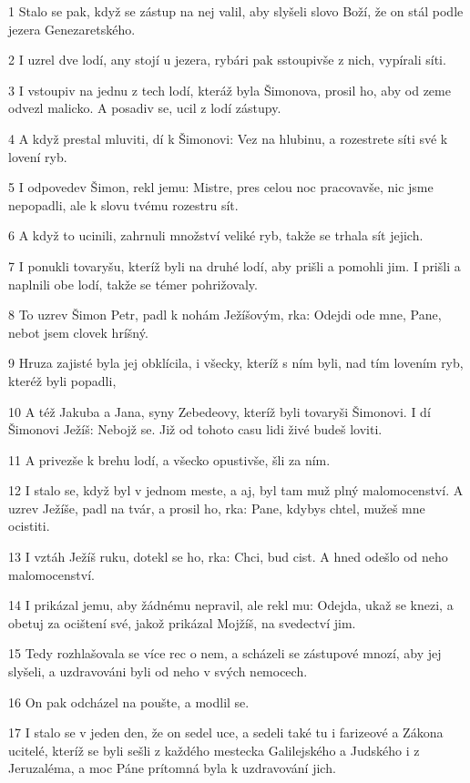 \par 1 Stalo se pak, když se zástup na nej valil, aby slyšeli slovo Boží, že on stál podle jezera Genezaretského.
\par 2 I uzrel dve lodí, any stojí u jezera, rybári pak sstoupivše z nich, vypírali síti.
\par 3 I vstoupiv na jednu z tech lodí, kteráž byla Šimonova, prosil ho, aby od zeme odvezl malicko. A posadiv se, ucil z lodí zástupy.
\par 4 A když prestal mluviti, dí k Šimonovi: Vez na hlubinu, a rozestrete síti své k lovení ryb.
\par 5 I odpovedev Šimon, rekl jemu: Mistre, pres celou noc pracovavše, nic jsme nepopadli, ale k slovu tvému rozestru sít.
\par 6 A když to ucinili, zahrnuli množství veliké ryb, takže se trhala sít jejich.
\par 7 I ponukli tovaryšu, kteríž byli na druhé lodí, aby prišli a pomohli jim. I prišli a naplnili obe lodí, takže se témer pohrižovaly.
\par 8 To uzrev Šimon Petr, padl k nohám Ježíšovým, rka: Odejdi ode mne, Pane, nebot jsem clovek hríšný.
\par 9 Hruza zajisté byla jej obklícila, i všecky, kteríž s ním byli, nad tím lovením ryb, kteréž byli popadli,
\par 10 A též Jakuba a Jana, syny Zebedeovy, kteríž byli tovaryši Šimonovi. I dí Šimonovi Ježíš: Nebojž se. Již od tohoto casu lidi živé budeš loviti.
\par 11 A privezše k brehu lodí, a všecko opustivše, šli za ním.
\par 12 I stalo se, když byl v jednom meste, a aj, byl tam muž plný malomocenství. A uzrev Ježíše, padl na tvár, a prosil ho, rka: Pane, kdybys chtel, mužeš mne ocistiti.
\par 13 I vztáh Ježíš ruku, dotekl se ho, rka: Chci, bud cist. A hned odešlo od neho malomocenství.
\par 14 I prikázal jemu, aby žádnému nepravil, ale rekl mu: Odejda, ukaž se knezi, a obetuj za ocištení své, jakož prikázal Mojžíš, na svedectví jim.
\par 15 Tedy rozhlašovala se více rec o nem, a scházeli se zástupové mnozí, aby jej slyšeli, a uzdravováni byli od neho v svých nemocech.
\par 16 On pak odcházel na poušte, a modlil se.
\par 17 I stalo se v jeden den, že on sedel uce, a sedeli také tu i farizeové a Zákona ucitelé, kteríž se byli sešli z každého mestecka Galilejského a Judského i z Jeruzaléma, a moc Páne prítomná byla k uzdravování jich.
